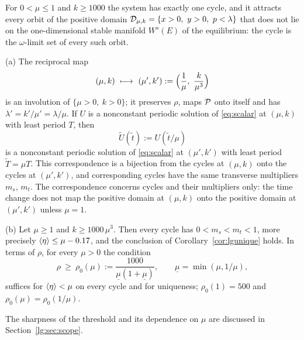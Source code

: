 \begin{corollary}[Uniqueness]\label{cor:lgunique}
For $0<\mu\le1$ and $k\ge1000$ the system has exactly one cycle, and it attracts every orbit of the
positive domain $\Dom=\{x>0,\ y>0,\ p<\lambda\}$ that does not lie on the one-dimensional stable
manifold $W^s(E)$ of the equilibrium: the cycle is the $\omega$-limit set of every such orbit.
\end{corollary}

\begin{corollary}\label{cor:lgreciprocal}
\textup{(a)} The reciprocal map
\[
(\mu,k)\ \longmapsto\ (\mu',k'):=\Bigl(\frac1\mu,\ \frac{k}{\mu^3}\Bigr)
\]
is an involution of $\{\mu>0,\ k>0\}$; it preserves $\rho$, maps $\mathcal P$ onto itself and has $\lambda'=k'/\mu'=\lambda/\mu$. If $U$ is a nonconstant periodic solution of \eqref{eq:scalar} at $(\mu,k)$ with least period $T$, then
\[
\tilde U(\tilde t):=U(\tilde t/\mu)
\]
is a nonconstant periodic solution of \eqref{eq:scalar} at $(\mu',k')$ with least period $\tilde T=\mu T$. This correspondence is a bijection from the cycles at $(\mu,k)$ onto the cycles at $(\mu',k')$, and corresponding cycles have the same transverse multipliers $m_s$, $m_t$. The correspondence concerns cycles and their multipliers only: the time change does not map the positive domain at $(\mu,k)$ onto the positive domain at $(\mu',k')$ unless $\mu=1$.

\textup{(b)} Let $\mu\ge1$ and $k\ge1000\,\mu^3$. Then every cycle has $0<m_s<m_t<1$, more precisely
$\left\langle \eta\right\rangle\le\mu-0.17$, and the conclusion of Corollary~\ref{cor:lgunique} holds. In terms of $\rho$,
for every $\mu>0$ the condition
\[
\rho\ \ge\ \rho_0(\mu):=\frac{1000}{\underline\mu(1+\underline\mu)},\qquad \underline\mu=\min(\mu,1/\mu),
\]
suffices for $\left\langle \eta\right\rangle<\mu$ on every cycle and for uniqueness; $\rho_0(1)=500$ and
$\rho_0(\mu)=\rho_0(1/\mu)$.
\end{corollary}

The sharpness of the threshold and its dependence on $\mu$ are discussed in Section~\ref{lg:sec:scope}.

